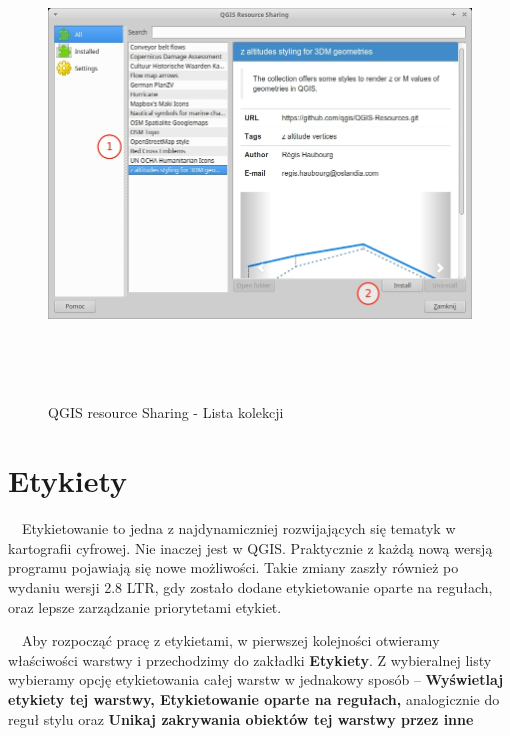 \documentclass[12pt,a4paper]{book}
\begin{document}
\begin{center}
\begin{figure}
\includegraphics[width=16.916cm,height=12.407cm]{007-qrs-kolekcje.jpg}
\caption{QGIS resource Sharing - Lista kolekcji}
\end{figure}
\end{center}
\section{Etykiety}
\ \ Etykietowanie to jedna z najdynamiczniej rozwijających się tematyk w kartografii cyfrowej. Nie inaczej jest w QGIS. Praktycznie z każdą nową wersją programu pojawiają się nowe możliwości. Takie zmiany zaszły również po wydaniu wersji 2.8 LTR, gdy zostało dodane etykietowanie oparte na regułach, oraz lepsze zarządzanie priorytetami etykiet.

\ \ Aby rozpocząć pracę z etykietami, w pierwszej kolejności otwieramy właściwości warstwy i przechodzimy do zakładki \textbf{Etykiety}. Z wybieralnej listy wybieramy opcję etykietowania całej warstw w jednakowy sposób – \textbf{Wyświetlaj etykiety tej warstwy, Etykietowanie oparte na regułach, }analogicznie do reguł stylu oraz\textbf{ Unikaj zakrywania obiektów tej  warstwy przez inne}
\end{document}
